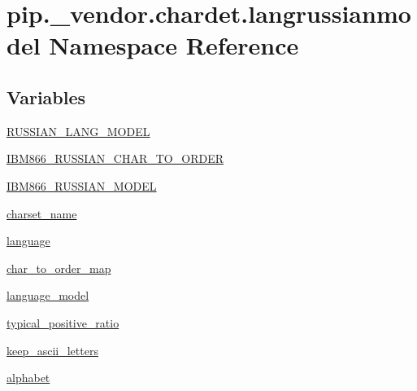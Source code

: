\hypertarget{namespacepip_1_1__vendor_1_1chardet_1_1langrussianmodel}{}\section{pip.\+\_\+vendor.\+chardet.\+langrussianmodel Namespace Reference}
\label{namespacepip_1_1__vendor_1_1chardet_1_1langrussianmodel}
\subsection*{Variables}
\begin{DoxyCompactItemize}
\item 
\hyperlink{namespacepip_1_1__vendor_1_1chardet_1_1langrussianmodel_a0fbc025f40b4d2cc8bdb0a8dffb3e8fd}{R\+U\+S\+S\+I\+A\+N\+\_\+\+L\+A\+N\+G\+\_\+\+M\+O\+D\+EL}
\item 
\hyperlink{namespacepip_1_1__vendor_1_1chardet_1_1langrussianmodel_a7f22fd70e9f1b50917690e6944f42760}{I\+B\+M866\+\_\+\+R\+U\+S\+S\+I\+A\+N\+\_\+\+C\+H\+A\+R\+\_\+\+T\+O\+\_\+\+O\+R\+D\+ER}
\item 
\hyperlink{namespacepip_1_1__vendor_1_1chardet_1_1langrussianmodel_accd1d4aeef9638521dfca3c90af8b806}{I\+B\+M866\+\_\+\+R\+U\+S\+S\+I\+A\+N\+\_\+\+M\+O\+D\+EL}
\item 
\hyperlink{namespacepip_1_1__vendor_1_1chardet_1_1langrussianmodel_a2d988e12e6d5e26f64a7af2e56ae25ef}{charset\+\_\+name}
\item 
\hyperlink{namespacepip_1_1__vendor_1_1chardet_1_1langrussianmodel_ac5bba3782a73450e0ff778acbb31258c}{language}
\item 
\hyperlink{namespacepip_1_1__vendor_1_1chardet_1_1langrussianmodel_a371fe3cfa6062da9382e95f9e80d8c0d}{char\+\_\+to\+\_\+order\+\_\+map}
\item 
\hyperlink{namespacepip_1_1__vendor_1_1chardet_1_1langrussianmodel_a5751f7a8b405e03c44886de947dace0b}{language\+\_\+model}
\item 
\hyperlink{namespacepip_1_1__vendor_1_1chardet_1_1langrussianmodel_aa60e9173dfd2e8c9dcdcadb08b8b9573}{typical\+\_\+positive\+\_\+ratio}
\item 
\hyperlink{namespacepip_1_1__vendor_1_1chardet_1_1langrussianmodel_a78c10437705a6e8fa43a12fc855ad9ec}{keep\+\_\+ascii\+\_\+letters}
\item 
\hyperlink{namespacepip_1_1__vendor_1_1chardet_1_1langrussianmodel_affb0aae2503d489aa71b91acbe45418b}{alphabet}
\item 

\end{DoxyCompactItemize}
